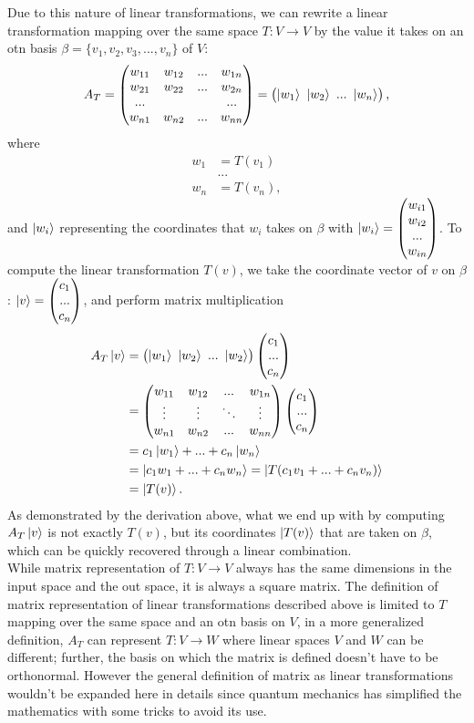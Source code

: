 \documentclass[12pt]{article}
\begin{document}
\noindent Due to this nature of linear transformations, we can rewrite a linear transformation mapping over the same space $T:V\rightarrow V$ by the value it takes on an otn basis $\beta=\{v_1, v_2, v_3,...,v_n\}$ of $V$:
$$A_T=\begin{pmatrix} w_{11} & w_{12} &... & w_{1n} \\ w_{21} & w_{22} &... & w_{2n}\\... & & &...\\ w_{n1} & w_{n2} &... & w_{nn} \end{pmatrix}=\pmqty{\ket{w_1} \ \ket{w_2} \ ... \ \ket{w_n}},$$
where
\begin{align*}
    w_1 &= T(v_1)\\
    &...\\
    w_n &= T(v_n),
\end{align*}
and $\ket{w_i}$ representing the coordinates that $w_i$ takes on $\beta$ with $\ket{w_i}=\pmqty{w_{i1}\\w_{i2}\\...\\w_{in}}$. To compute the linear transformation $T(v)$, we take the coordinate vector of $v$ on $\beta$: $\ket{v} = \pmqty{c_1\\...\\c_n}$, and perform matrix multiplication
\begin{align*}
    A_T\ket{v}&=\pmqty{\ket{w_1}\ \ket{w_2}\ ...\ \ket{w_2}}\pmqty{c_1\\...\\c_n}\\
    &=\begin{pmatrix} w_{11} & w_{12} &... & w_{1n} \\ \vdots &\vdots &\ddots &\vdots\\ w_{n1} & w_{n2} &... & w_{nn} \end{pmatrix}\pmqty{c_1\\...\\c_n}\\
    &=c_1\ket{w_1}+...+c_n\ket{w_n}\\
    &=\ket{c_1w_1+...+c_nw_n}=\ket{T(c_1v_1+...+c_nv_n)}\\
    &=\ket{T(v)}.
\end{align*}
As demonstrated by the derivation above, what we end up with by computing $A_T\ket{v}$ is not exactly $T(v)$, but its coordinates $\ket{T(v)}$ that are taken on $\beta$, which can be quickly recovered through a linear combination.\\
While matrix representation of $T:V\rightarrow V$ always has the same dimensions in the input space and the out space, it is always a square matrix. The definition of matrix representation of linear transformations described above is limited to $T$ mapping over the same space and an otn basis on $V$, in a more generalized definition, $A_T$ can represent $T:V\rightarrow W$ where linear spaces $V$ and $W$ can be different; further, the basis on which the matrix is defined doesn't have to be orthonormal. However the general definition of matrix as linear transformations wouldn't be expanded here in details since quantum mechanics has simplified the mathematics with some tricks to avoid its use.
\end{document}
